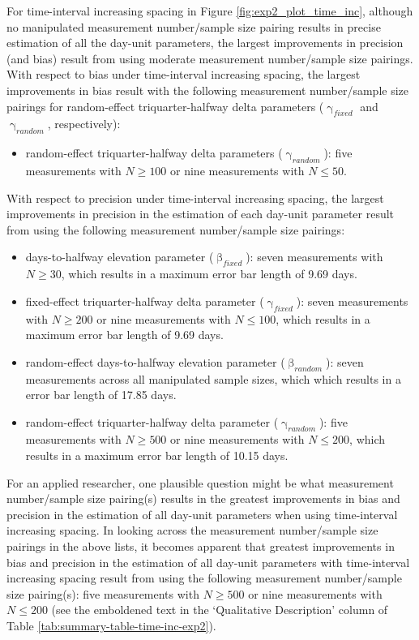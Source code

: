 \documentclass[
12pt, %
twoside,
english]{guelphthesis}
\begin{document}
For time-interval increasing spacing in Figure \ref{fig:exp2_plot_time_inc}, although no manipulated measurement number/sample size pairing results in precise estimation of all the day-unit parameters, the largest improvements in precision (and bias) result from using moderate measurement number/sample size pairings. With respect to bias under time-interval increasing spacing, the largest improvements in bias result with the following measurement number/sample size pairings for random-effect triquarter-halfway delta parameters (\(\upgamma_{fixed}\) and \(\upgamma_{random}\), respectively):
\begin{itemize}
\tightlist
\item
  random-effect triquarter-halfway delta parameters (\(\upgamma_{random}\)): five measurements with \(N \ge 100\) or nine measurements with \(N \le 50\).
\end{itemize}
\noindent With respect to precision under time-interval increasing spacing, the largest improvements in precision in the estimation of each day-unit parameter result from using the following measurement number/sample size pairings:
\begin{itemize}
\tightlist
\item
  days-to-halfway elevation parameter (\(\upbeta_{fixed}\)): seven measurements with \(N \ge 30\), which results in a maximum error bar length of 9.69 days.
\item
  fixed-effect triquarter-halfway delta parameter (\(\upgamma_{fixed}\)): seven measurements with \(N \ge 200\) or nine measurements with \(N \le 100\), which results in a maximum error bar length of 9.69 days.
\item
  random-effect days-to-halfway elevation parameter (\(\upbeta_{random}\)): seven measurements across all manipulated sample sizes, which which results in a error bar length of 17.85 days.
\item
  random-effect triquarter-halfway delta parameter (\(\upgamma_{random}\)): five measurements with \(N \ge 500\) or nine measurements with \(N \le 200\), which results in a maximum error bar length of 10.15 days.
\end{itemize}
For an applied researcher, one plausible question might be what measurement number/sample size pairing(s) results in the greatest improvements in bias and precision in the estimation of all day-unit parameters when using time-interval increasing spacing. In looking across the measurement number/sample size pairings in the above lists, it becomes apparent that greatest improvements in bias and precision in the estimation of all day-unit parameters with time-interval increasing spacing result from using the following measurement number/sample size pairing(s): five measurements with \(N \ge 500\) or nine measurements with \(N \le 200\) (see the emboldened text in the `Qualitative Description' column of Table \ref{tab:summary-table-time-inc-exp2}).
\end{document}
